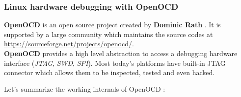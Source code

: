 \subsubsection{Linux hardware debugging with OpenOCD}
\textbf{OpenOCD} is an open source project created by \og \textbf{Dominic Rath} \fg . It is supported by a large community which
maintains the source codes at {\color{blue}\url{https://sourceforge.net/projects/openocd/}}.\\
\textbf{OpenOCD} provides a high level abstraction to access a debugging hardware interface (\emph{JTAG}, \emph{SWD}, \emph{SPI}). Most
today's platforms have built-in JTAG connector which allows them to be {\color{green}inspected}, {\color{orange}tested} and even {\color{red}hacked}.

Let's summarize the working internals of OpenOCD : 

